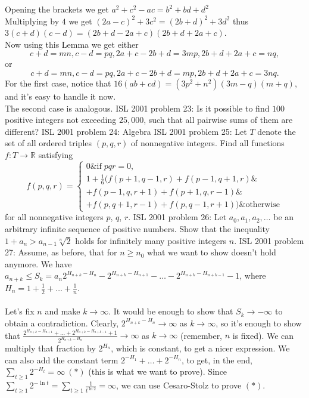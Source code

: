 Opening the brackets we get $a^2+c^2-ac=b^2+bd+d^2$ \\
Multiplying by $4$ we get $(2a-c)^2+3c^2=(2b+d)^2+3d^2$ thus $3(c+d)(c-d)=(2b+d-2a+c)(2b+d+2a+c)$. \\
Now using this Lemma we get either
\[ c+d=mn, c-d=pq, 2a+c-2b+d=3mp, 2b+d+2a+c=nq, \]
or
\[ c+d=mn, c-d=pq, 2a+c-2b+d=mp, 2b+d+2a+c=3nq. \]
For the first case, notice that $16(ab+cd)=(3p^2+n^2)(3m-q)(m+q)$, and it's easy to handle it now. \\
The second case is analogous. 
ISL 2001 problem 23:  Is it possible to find  $100$ positive integers not exceeding $25,000$, such that all pairwise sums of them are different? 
ISL 2001 problem 24:  Algebra 
ISL 2001 problem 25:  Let $ T$ denote the set of all ordered triples $ (p,q,r)$ of nonnegative integers. Find all functions $ f: T \rightarrow \mathbb{R}$ satisfying
\[
f(p,q,r) =
\begin{cases} 0 \& \text{if} \; pqr = 0, \\
1 + \frac{1}{6}(f(p + 1,q - 1,r) + f(p - 1,q + 1,r) \& \\
+ f(p - 1,q,r + 1) + f(p + 1,q,r - 1) \& \\
 + f(p,q + 1,r - 1) + f(p,q - 1,r + 1)) \& \text{otherwise} \end{cases}
\]
for all nonnegative integers $ p$, $ q$, $ r$. 
ISL 2001 problem 26:  Let $a_0, a_1, a_2, \ldots$ be an arbitrary infinite sequence of positive numbers.  Show that the inequality $1 + a_n > a_{n-1} \sqrt[n]{2}$ holds for infinitely many positive integers $n$. 
ISL 2001 problem 27:  Assume, as before, that for $n\ge n_0$ what we want to show doesn't hold anymore. We have $a_{n+k}\le S_k=a_n2^{H_{n+k}-H_n}-2^{H_{n+k}-H_{n+1}}-\ldots-2^{H_{n+k}-H_{n+k-1}}-1$, where $H_n=1+\frac 12+\ldots+\frac 1n$. \\\\
Let's fix $n$ and make $k\to\infty$. It would be enough to show that $S_k\to-\infty$ to obtain a contradiction. Clearly, $2^{H_{n+k}-H_n}\to\infty$ as $k\to\infty$, so it's enough to show that $\frac{2^{H_{n+k}-H_{n+1}}+\ldots+2^{H_{n+k}-H_{n+k-1}}+1}{2^{H_{n+k}-H_n}}\to\infty$ as $k\to\infty$ (remember, $n$ is fixed). We can multiply that fraction by $2^{H_n}$, which is constant, to get a nicer expression. We can also add the constant term $2^{-H_1}+\ldots+2^{-H_n}$, to get, in the end, $\sum_{t\ge 1} 2^{-H_t}=\infty\ (*)$ (this is what we want to prove). Since $\sum_{t\ge 1}2^{-\ln t}=\sum_{t\ge 1}\frac 1{t^{\ln 2}}=\infty$, we can use Cesaro-Stolz to prove $(*)$. \\\\
